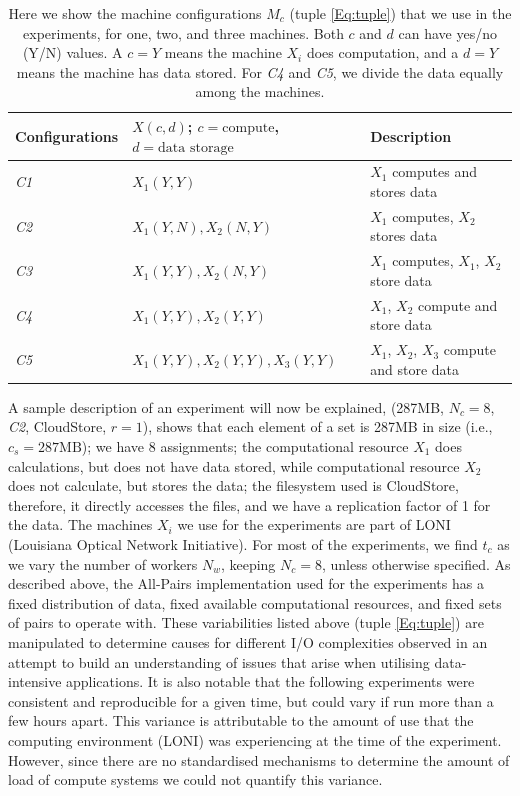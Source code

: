 \documentclass{rspublic}
\begin{document}
\begin{table}
\begin{center}
    \begin{tabular}{ | l | l | l |}
    \hline
    Configurations & $X(c,d)$; $c= \mbox{compute}$, $d=\mbox{data storage}$ & Description  \\ \hline
    \textit{C1} & $X_1(Y,Y)$  & $X_1$ computes and stores data\\ \hline    
    \textit{C2} & $X_1(Y,N), X_2(N,Y)$  & $X_1$ computes, $X_2$ stores data \\ \hline
    \textit{C3} & $X_1(Y,Y), X_2(N,Y)$  & $X_1$ computes, $X_1$, $X_2$ store data \\ \hline
    \textit{C4} & $X_1(Y,Y), X_2(Y,Y)$  & $X_1$, $X_2$ compute and store data \\ \hline
    \textit{C5} & $X_1(Y,Y), X_2(Y,Y), X_3(Y,Y)$  & $X_1$, $X_2$, $X_3$ compute and store data \\ 
    \hline
    \end{tabular}
\end{center}
    \caption{Here we show the machine configurations $M_c$ (tuple
\ref{Eq:tuple}) that we use in the experiments, for one, two, and three
machines. Both $c$ and $d$ can have yes/no (Y/N) values. A $c = Y$ means
the machine $X_i$ does computation, and a $d = Y$ means the machine has
data stored. For \textit{C4} and \textit{C5}, we divide the data equally among the
machines.}
    \label{Tab:Configs}
\end{table}


A sample description of an experiment will now be explained, 
(287MB, $N_c=8$, \textit{C2}, CloudStore, $r=1$),
shows that each element of a set is 287MB in size (i.e., $c_s=287\mbox{MB}$); we have 8
assignments; the computational resource $X_1$ does calculations, but
does not have data stored, while computational resource $X_2$ does not
calculate, but stores the data; the filesystem used is CloudStore, therefore, it
directly accesses the files, and we have a replication factor of 1 for the
data. The machines $X_i$ we use for the experiments are part of LONI
(Louisiana Optical Network Initiative). For most of the experiments, we
find $t_c$ as we vary the number of workers $N_w$, keeping $N_c=8$,
 unless otherwise specified. As described
above, the All-Pairs implementation used for the experiments has a fixed
distribution of data, fixed available computational resources, and fixed
sets of pairs to operate with. These variabilities listed above (tuple
\ref{Eq:tuple}) are manipulated to determine causes for different I/O
complexities observed in an attempt to build an understanding of issues
that arise when utilising data-intensive applications. It is also
notable that the following experiments were consistent and reproducible
for a given time, but could vary if run more than a few hours apart.
This variance is attributable to the amount of use that the computing
environment (LONI) was experiencing at the time of the experiment.
However, since there are no standardised mechanisms to determine the
amount of load of compute systems we could not quantify this variance.
\end{document}
